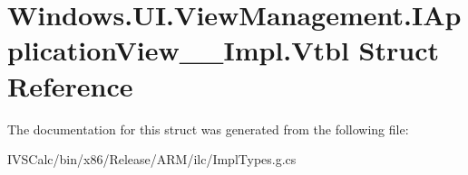 \hypertarget{struct_windows_1_1_u_i_1_1_view_management_1_1_i_application_view_____impl_1_1_vtbl}{}\section{Windows.\+U\+I.\+View\+Management.\+I\+Application\+View\+\_\+\+\_\+\+Impl.\+Vtbl Struct Reference}
\label{struct_windows_1_1_u_i_1_1_view_management_1_1_i_application_view_____impl_1_1_vtbl}


The documentation for this struct was generated from the following file\+:\begin{DoxyCompactItemize}
\item 
I\+V\+S\+Calc/bin/x86/\+Release/\+A\+R\+M/ilc/Impl\+Types.\+g.\+cs\end{DoxyCompactItemize}
